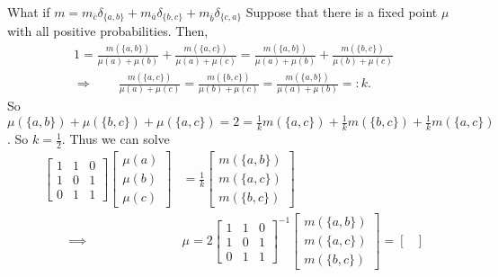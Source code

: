 \documentclass{article}
\begin{document}
\begin{computation}
    
    What if $m = m_{\bar c}\delta_{\{a,b\}} + m_{\bar a}\delta_{\{b,c\}} + m_{\bar b}\delta_{\{c,a\}}$
    Suppose that there is a fixed point $\mu$ with all positive probabilities. Then,
    \begin{align*}
         1 = \frac{m(\{a,b\})}{\mu(a) + \mu(b)} + \frac{m(\{a,c\})}{\mu(a) + \mu(c)} 
         = \frac{m(\{a,b\})}{\mu(a) + \mu(b)} + \frac{m(\{b,c\})}{\mu(b) + \mu(c)} \\
         \Rightarrow \qquad
         \frac{m(\{a,c\})}{\mu(a) + \mu(c)} = \frac{m(\{b,c\})}{\mu(b) + \mu(c)} = \frac{m(\{a,b\})}{\mu(a) + \mu(b)} =: k.
    \end{align*}
    So $\mu(\{a,b\}) + \mu(\{b,c\}) + \mu(\{a,c\}) = 2 = \frac{1}{k}m(\{a,c\}) + \frac1km(\{b,c\}) + \frac1k m(\{a,c\})$. So $k=\frac12$. Thus we can solve
    \begin{align*}
        \begin{bmatrix}
            1 & 1 & 0 \\
            1 & 0 & 1 \\
            0 & 1 & 1
        \end{bmatrix}
        \begin{bmatrix}
            \mu(a) \\ \mu(b) \\\mu(c)
        \end{bmatrix}
        &= 
        \frac1k
        \begin{bmatrix}
            m(\{a,b\}) \\ m(\{a,c\}) \\ m(\{b,c\})
        \end{bmatrix}\\
    \qquad\implies\qquad& 
        \mu = 2
            \begin{bmatrix}
                1 & 1 & 0 \\
                1 & 0 & 1 \\
                0 & 1 & 1
            \end{bmatrix}^{-1}
            \begin{bmatrix}
                m(\{a,b\}) \\ m(\{a,c\}) \\ m(\{b,c\})
            \end{bmatrix}
        = 
        \begin{bmatrix}

\end{bmatrix}
\end{align*}
\end{computation}
\end{document}
